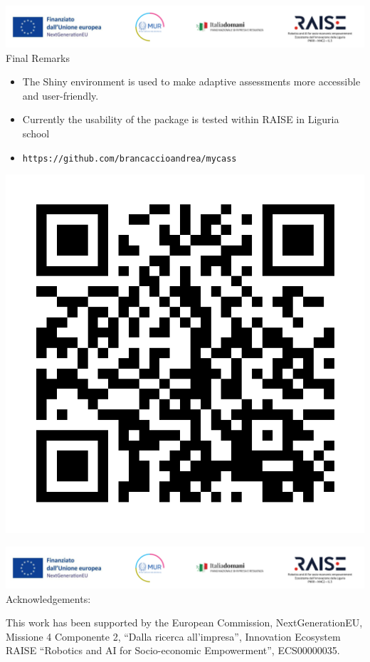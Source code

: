 \documentclass{beamer}
\begin{document}
\begin{frame}{\includegraphics[scale=0.4]{Da_cambiare.png} \\ 
Final Remarks}{}
 \begin{itemize}
 \item   The Shiny environment is used to make adaptive assessments more accessible and user-friendly.\\
   \vspace{.1cm}
 \item  Currently the usability of the package is tested within RAISE in Liguria school\\
  \vspace{.1cm}
 \item \texttt{https://github.com/brancaccioandrea/mycass}
  \end{itemize}
  \begin{center}
  \includegraphics[scale=0.25]{qr.pdf}
  \end{center}
  
   \end{frame}
   
\begin{frame}{\includegraphics[scale=0.4]{Da_cambiare.png} \\ 
Acknowledgements:}{}
 
 
This work has been supported by the European Commission, NextGenerationEU, Missione 4 Componente 2, “Dalla ricerca all’impresa”, Innovation Ecosystem RAISE “Robotics and AI for Socio-economic Empowerment”, ECS00000035.


\end{frame}
\end{document}
